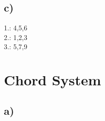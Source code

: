 \documentclass{article}
\begin{document}
\subsection*{c)}
1.: 4,5,6
\\2.: 1,2,3
\\3.: 5,7,9

\section{Chord System}
\subsection*{a)}
\end{document}
